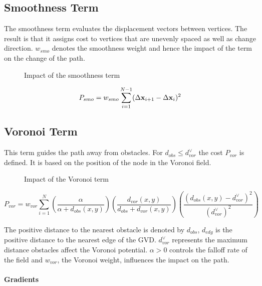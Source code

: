 \subsection{Smoothness Term}
The smoothness term evaluates the displacement vectors between vertices. The result is that it assigns cost to vertices that are unevenly spaced as well as change direction. $w_{smo}$ denotes the smoothness weight and hence the impact of the term on the change of the path.

\begin{figure}[h]
    \caption{Impact of the smoothness term}
    \label{fig:smoothnessTerm}
\end{figure}

\begin{equation}
P_{smo} = w_{smo} \displaystyle\sum_{i=1}^{N-1} (\Delta\mathbf{x}_{i+1} - \Delta\mathbf{x}_i)^2
\end{equation}

\subsection{Voronoi Term}
This term guides the path away from obstacles. For $d_{obs} \leq d_{vor}^{\lor}$ the cost $P_{vor}$ is defined. It is based on the position of the node in the Voronoi field.

\begin{figure}[h]
    \caption{Impact of the Voronoi term}
    \label{fig:VoronoiTerm}
\end{figure}


\begin{equation}
P_{vor} = w_{vor} \displaystyle\sum_{i=1}^{N} \left(\frac{\alpha}{\alpha + d_{obs}(x,y)}\right)\left(\frac{d_{vor}(x,y)}{d_{obs} + d_{vor}(x,y)}\right)\left(\frac{(d_{obs}(x,y) - d_{vor}^{\lor})^2}{(d_{vor}^{\lor})^2}\right)
\end{equation}

The positive distance to the nearest obstacle is denoted by $d_{obs}$, $d_{edg}$ is the positive distance to the nearest edge of the GVD. $d_{vor}^{\lor}$ represents the maximum distance obstacles affect the Voronoi potential. $\alpha > 0$ controls the falloff rate of the field and $w_{vor}$, the Voronoi weight, influences the impact on the path.

\paragraph{Gradients}

